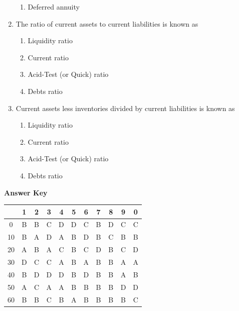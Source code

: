 \documentclass[11pt,a4paper]{article}
\begin{document}
\begin{enumerate}
\begin{enumerate}[label=\Alph*.]
\item{Deferred annuity}
\end{enumerate}
\item{The ratio of current assets to current liabilities is known as}
\begin{enumerate}[label=\Alph*.]
\item{Liquidity ratio}
\item{Current ratio}
\item{Acid-Test (or Quick) ratio}
\item{Debts ratio}
\end{enumerate}
\item{Current assets less inventories divided by current liabilities is known as}
\begin{enumerate}[label=\Alph*.]
\item{Liquidity ratio}
\item{Current ratio}
\item{Acid-Test (or Quick) ratio}
\item{Debts ratio}
\end{enumerate}
\end{enumerate}
\textbf{Answer Key}
\begin{tabular}{ | c | c c c c c c c c c c | }
\hline
 & 1 & 2 & 3 & 4 & 5 & 6 & 7 & 8 & 9 & 0 \\
\hline
0 & B & B & C & D & D & C & B & D & C & C \\
10 & B & A & D & A & B & D & B & C & B & B \\
20 & A & B & A & C & B & C & D & B & C & D \\
30 & D & C & C & A & B & A & B & B & A & A \\
40 & B & D & D & D & B & D & B & B & A & B \\
50 & A & C & A & A & B & B & B & B & D & D \\
60 & B & B & C & B & A & B & B & B & B & C \\
\hline
\end{tabular}
\clearpage
\end{document}
